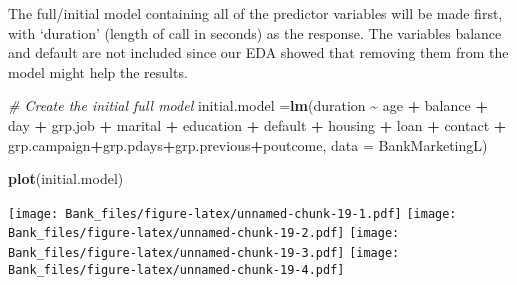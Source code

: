 \documentclass[
]{article}
\newenvironment{Shaded}{\begin{snugshade}}{\end{snugshade}}
\newcommand{\AttributeTok}[1]{\textcolor[rgb]{0.13,0.29,0.53}{#1}}
\newcommand{\CommentTok}[1]{\textcolor[rgb]{0.56,0.35,0.01}{\textit{#1}}}
\newcommand{\FunctionTok}[1]{\textcolor[rgb]{0.13,0.29,0.53}{\textbf{#1}}}
\newcommand{\NormalTok}[1]{#1}
\newcommand{\OtherTok}[1]{\textcolor[rgb]{0.56,0.35,0.01}{#1}}
\newcommand{\SpecialCharTok}[1]{\textcolor[rgb]{0.81,0.36,0.00}{\textbf{#1}}}
\newcommand{\StringTok}[1]{\textcolor[rgb]{0.31,0.60,0.02}{#1}}
\begin{document}
The full/initial model containing all of the predictor variables will be
made first, with `duration' (length of call in seconds) as the response.
The variables balance and default are not included since our EDA showed
that removing them from the model might help the results.

\begin{Shaded}
\begin{Highlighting}[]
\CommentTok{\# Create the initial full model}
\NormalTok{initial.model }\OtherTok{=}\FunctionTok{lm}\NormalTok{(duration }\SpecialCharTok{\textasciitilde{}}\NormalTok{ age }\SpecialCharTok{+}\NormalTok{ balance }\SpecialCharTok{+}\NormalTok{ day }\SpecialCharTok{+}\NormalTok{ grp.job }\SpecialCharTok{+}\NormalTok{ marital }\SpecialCharTok{+}\NormalTok{ education }\SpecialCharTok{+}\NormalTok{ default }\SpecialCharTok{+}\NormalTok{ housing }\SpecialCharTok{+}\NormalTok{ loan }\SpecialCharTok{+}\NormalTok{ contact }\SpecialCharTok{+}\NormalTok{ grp.campaign}\SpecialCharTok{+}\NormalTok{grp.pdays}\SpecialCharTok{+}\NormalTok{grp.previous}\SpecialCharTok{+}\NormalTok{poutcome, }\AttributeTok{data =}\NormalTok{ BankMarketingL)}

\FunctionTok{plot}\NormalTok{(initial.model)}
\end{Highlighting}
\end{Shaded}

\texttt{[image: Bank\_files/figure-latex/unnamed-chunk-19-1.pdf]}
\texttt{[image: Bank\_files/figure-latex/unnamed-chunk-19-2.pdf]}
\texttt{[image: Bank\_files/figure-latex/unnamed-chunk-19-3.pdf]}
\texttt{[image: Bank\_files/figure-latex/unnamed-chunk-19-4.pdf]}

\begin{Shaded}
\end{Shaded}
\end{document}
